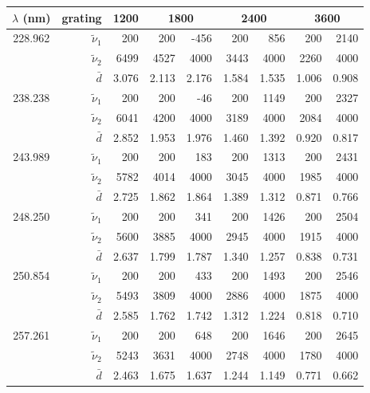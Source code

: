 \begin{tabular}{crrrrrrrr}
\toprule
$\lambda$ (nm)
	& grating & 1200 & \multicolumn{2}{c}{1800}
		& \multicolumn{2}{c}{2400} & \multicolumn{2}{c}{3600} \\
\midrule
\multirow{3}{*}{228.962}
	& $\tilde{\nu}_1$ &   200 &   200 &  -456 &   200 &   856 &   200 &  2140 \\
	& $\tilde{\nu}_2$ &  6499 &  4527 &  4000 &  3443 &  4000 &  2260 &  4000 \\
	& $\bar{d}$       & 3.076 & 2.113 & 2.176 & 1.584 & 1.535 & 1.006 & 0.908 \\
\midrule
\multirow{3}{*}{238.238}
	& $\tilde{\nu}_1$ &   200 &   200 &   -46 &   200 &  1149 &   200 &  2327 \\
	& $\tilde{\nu}_2$ &  6041 &  4200 &  4000 &  3189 &  4000 &  2084 &  4000 \\
	& $\bar{d}$       & 2.852 & 1.953 & 1.976 & 1.460 & 1.392 & 0.920 & 0.817 \\
\midrule
\multirow{3}{*}{243.989}
	& $\tilde{\nu}_1$ &   200 &   200 &   183 &   200 &  1313 &   200 &  2431 \\
	& $\tilde{\nu}_2$ &  5782 &  4014 &  4000 &  3045 &  4000 &  1985 &  4000 \\
	& $\bar{d}$       & 2.725 & 1.862 & 1.864 & 1.389 & 1.312 & 0.871 & 0.766 \\
\midrule
\multirow{3}{*}{248.250}
	& $\tilde{\nu}_1$ &   200 &   200 &   341 &   200 &  1426 &   200 &  2504 \\
	& $\tilde{\nu}_2$ &  5600 &  3885 &  4000 &  2945 &  4000 &  1915 &  4000 \\
	& $\bar{d}$       & 2.637 & 1.799 & 1.787 & 1.340 & 1.257 & 0.838 & 0.731 \\
\midrule
\multirow{3}{*}{250.854}
	& $\tilde{\nu}_1$ &   200 &   200 &   433 &   200 &  1493 &   200 &  2546 \\
	& $\tilde{\nu}_2$ &  5493 &  3809 &  4000 &  2886 &  4000 &  1875 &  4000 \\
	& $\bar{d}$       & 2.585 & 1.762 & 1.742 & 1.312 & 1.224 & 0.818 & 0.710 \\
\midrule
\multirow{3}{*}{257.261}
	& $\tilde{\nu}_1$ &   200 &   200 &   648 &   200 &  1646 &   200 &  2645 \\
	& $\tilde{\nu}_2$ &  5243 &  3631 &  4000 &  2748 &  4000 &  1780 &  4000 \\
	& $\bar{d}$       & 2.463 & 1.675 & 1.637 & 1.244 & 1.149 & 0.771 & 0.662 \\
\bottomrule
\end{tabular}
